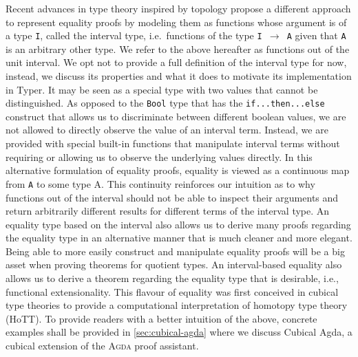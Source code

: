\documentclass[12pt,twoside,maitrise]{dms}
\theoremstyle{definition}
\numberwithin{equation}{section}
\numberwithin{table}{chapter}
\numberwithin{figure}{chapter}
\newcommand\kw[1] {\textsf{#1}}
\newcommand\id[1] {\texttt{#1}}
\newcommand\fn[1] {\texttt{#1}}
\def\Agda{\textsc{Agda}\xspace}
\begin{document}
Recent advances in type theory inspired by topology propose a different
approach to represent equality proofs by modeling them as functions whose
argument is of a type \id{I}, called the interval type, i.e.\ functions of the
type \fn{I $\rightarrow$ A} given that \id{A} is an arbitrary other type. We
refer to the above hereafter as functions out of the unit interval. We opt not
to provide a full definition of the interval type for now, instead, we discuss
its properties and what it does to motivate its implementation in Typer. It may
be seen as a special type with two values that cannot be distinguished. As
opposed to the \id{Bool} type that has the \fn{\kw{if}...\kw{then}...\kw{else}}
construct that allows us to discriminate between different boolean values, we
are not allowed to directly observe the value of an interval term. Instead, we
are provided with special built-in functions that manipulate interval terms
without requiring or allowing us to observe the underlying values directly. In
this alternative formulation of equality proofs, equality is viewed as a
continuous map from \id{A} to some type A. This continuity reinforces our
intuition as to why functions out of the interval should not be able to inspect
their arguments and return arbitrarily different results for different terms of
the interval type.
An equality type based on the interval also allows us to derive many proofs
regarding the equality type in an alternative manner that is much cleaner and
more elegant. Being able to more easily construct and manipulate equality
proofs will be a big asset when proving theorems for quotient types. An
interval-based equality also allows us to derive a theorem regarding the
equality type that is desirable, i.e., functional extensionality. This flavour
of equality was first conceived in cubical type theories\cite{bezem2014model}
to provide a computational interpretation of homotopy type theory
(HoTT)\cite{HoTTbook}. To provide readers with a better intuition of the above,
concrete examples shall be provided in \autoref{sec:cubical-agda} where we
discuss Cubical Agda\cite{vezzosi2021cubical}, a cubical extension of the
\Agda{} proof assistant.
\end{document}
